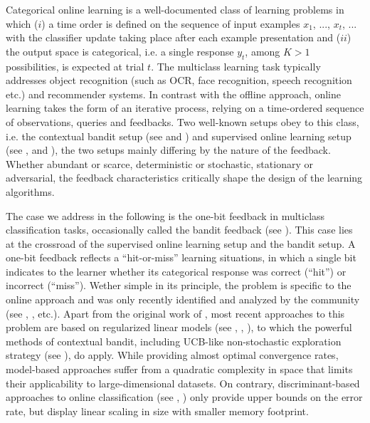 \documentclass[preprint,12pt,authoryear]{elsarticle}
\begin{document}
Categorical online learning is a well-documented class of learning problems in which ($i$) a time order is defined on the sequence of input examples  $x_1$, ..., $x_t$, ... with the classifier update taking place after each example presentation and ($ii$) the output space is categorical, i.e. a single response $y_t$, among $K>1$ possibilities, is expected at trial $t$. The multiclass learning task typically addresses object recognition (such as OCR, face recognition, speech recognition etc.) and recommender systems. In contrast with the offline approach, online learning takes the form of an iterative process, relying on a time-ordered sequence of observations, queries and feedbacks.   
Two well-known setups obey to this class, i.e. the contextual bandit setup (see  \cite{lai1985asymptotically} and \cite{auer2002finite}) and supervised online learning setup (see  \cite{rosenblatt1958perceptron}, \cite{duda1973pattern} and \cite{freund1999large}), the two setups mainly differing by the nature of the feedback. Whether abundant or scarce, deterministic or stochastic, stationary or adversarial, the feedback characteristics critically shape the design of the learning algorithms.  

The case we address in the following is the one-bit feedback in multiclass classification tasks, occasionally called the bandit feedback (see \cite{kakade2008efficient}). This case lies at the crossroad of the supervised online learning setup and the bandit setup.  A one-bit feedback reflects a ``hit-or-miss'' learning situations, in which a single bit indicates to the learner whether its categorical response was correct (``hit'') or incorrect (``miss''). Wether simple in its principle, the problem is specific to the online approach and was only recently identified and analyzed by the community (see \cite{kakade2008efficient}, \cite{gentile2012multilabel}, etc.). 
Apart from the original work of \cite{kakade2008efficient}, most recent approaches to this problem are based on regularized linear models (see \cite{li2010contextual}, \cite{crammer2013multiclass}, \cite{ngo2013upper}), to which the powerful methods of contextual bandit, including UCB-like non-stochastic exploration strategy (see \cite{lai1985asymptotically}), do apply. While providing almost optimal convergence rates, model-based approaches suffer from a quadratic complexity in space that limits their applicability to large-dimensional datasets.  On contrary, discriminant-based approaches to online classification (see \cite{anlauf1989adatron}, \cite{crammer2006online}) only provide upper bounds on the error rate, but display linear scaling in size with smaller memory footprint. 
\end{document}
